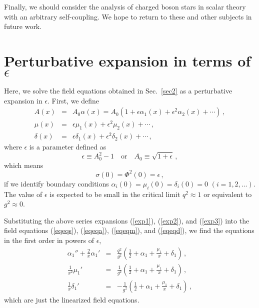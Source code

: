 \documentclass[
aps,prd,
12pt,%
nopreprintnumbers,
showpacs,
eqsecnum,
nofootinbib
]{revtex4-1}
\begin{document}
Finally, we should consider the analysis of charged boson stars in scalar theory
with an arbitrary self-coupling. We hope to return to these and other subjects in
future work.

\appendix
\section{Perturbative expansion in terms of $\epsilon$}
\label{sec3}
Here, we solve the field equations obtained in
Sec.~\ref{sec2} as a perturbative expansion in $\epsilon$.
First, we define 
\begin{eqnarray}
A(x)&=&
A_0\alpha(x)=A_0(1+\epsilon \alpha_1(x)+\epsilon^2
\alpha_2(x)+\cdots)
\,,\label{exp1}\\
\mu(x)&=&\epsilon \mu_1(x)+\epsilon^2 \mu_{2}(x)+\cdots\,,
\label{exp2}\\
\delta(x)&=&\epsilon \delta_{1}(x)+\epsilon^2 \delta_{2}(x)+\cdots\,,
\label{exp3}
\end{eqnarray}
where $\epsilon$ is a parameter defined as
\begin{equation}
\epsilon\equiv A_0^2-1\quad\mbox{or}\quad A_0\equiv\sqrt{1+\epsilon}\,,
\end{equation}
which means
\begin{equation}
\sigma(0)=\Phi^2(0)=\epsilon\,,
\end{equation}
if we identify boundary conditions $\alpha_i(0)=\mu_i(0)=\delta_i(0)=0$
$(i=1, 2, \dots)$.
The value of $\epsilon$ is expected to be small in the critical limit
$q^2\approx 1$ or equivalent to $g^2\approx 0$.

Substituting the above series expansions (\ref{exp1}), (\ref{exp2}), and
(\ref{exp3}) into the field equations (\ref{eqeqs}), (\ref{eqeqa}), (\ref{eqeqm}),
and (\ref{eqeqd}), we find the equations in the first order in powers of
$\epsilon$, 
\begin{eqnarray}
\alpha_1''+\frac{2}{x}\alpha_1'&=&\frac{q^2}{g^2}\left(\frac{1}{2}+\alpha_1+
\frac{\mu_{1}}{x}+\delta_1\right)
\,,\\
\frac{1}{x^2}\mu_{1}'&=&\frac{1}{g^2}
\left(\frac{1}{2}+\alpha_1+\frac{\mu_{1}}{x}+\delta_1\right)\,,\\
\frac{1}{x}\delta_1'&=&-\frac{1}{g^2}\left(\frac{1}{2}+\alpha_1+
\frac{\mu_{1}}{x}+\delta_1\right)\,,
\end{eqnarray}
which are just the linearized field equations.
\end{document}
